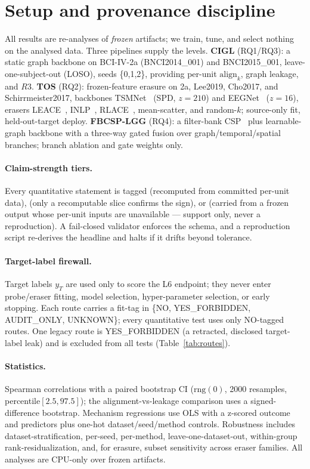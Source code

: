 \section{Setup and provenance discipline}
\label{sec:setup}

All results are re-analyses of \emph{frozen} artifacts; we train, tune, and select nothing on the
analysed data. Three pipelines supply the levels. \textbf{CIGL} (RQ1/RQ3): a static graph backbone on
BCI-IV-2a (BNCI2014\_001) and BNCI2015\_001, leave-one-subject-out (LOSO), seeds \{0,1,2\}, providing
per-unit $\mathrm{align}_k$, graph leakage, and $R3$. \textbf{TOS} (RQ2): frozen-feature erasure on
2a, Lee2019, Cho2017, and Schirrmeister2017, backbones TSMNet~\citep{kobler2022tsmnet}
(SPD, $z{=}210$) and EEGNet~\citep{lawhern2018eegnet} ($z{=}16$), erasers
LEACE~\citep{belrose2023leace}, INLP~\citep{ravfogel2020inlp}, RLACE~\citep{ravfogel2022rlace},
mean-scatter, and random-$k$; source-only fit, held-out-target deploy. \textbf{FBCSP-LGG} (RQ4): a
filter-bank CSP~\citep{ang2012fbcsp} plus learnable-graph backbone with a three-way gated fusion over
graph/temporal/spatial branches; branch ablation and gate weights only.

\paragraph{Claim-strength tiers.} Every quantitative statement is tagged  (recomputed
from committed per-unit data),  (only a recomputable slice confirms the
sign), or  (carried from a frozen output whose per-unit inputs are
unavailable --- support only, never a reproduction). A fail-closed validator enforces the schema, and a
reproduction script re-derives the headline and halts if it drifts beyond tolerance.

\paragraph{Target-label firewall.} Target labels $y_T$ are used only to score the L6 endpoint; they
never enter probe/eraser fitting, model selection, hyper-parameter selection, or early stopping. Each
route carries a fit-tag in \{NO, YES\_FORBIDDEN, AUDIT\_ONLY, UNKNOWN\}; every quantitative test uses
only NO-tagged routes. One legacy route is YES\_FORBIDDEN (a retracted, disclosed target-label leak)
and is excluded from all tests (Table~\ref{tab:routes}).

\paragraph{Statistics.} Spearman correlations with a paired bootstrap CI ($\mathrm{rng}(0)$, 2000
resamples, percentile$[2.5,97.5]$); the alignment-vs-leakage comparison uses a signed-difference
bootstrap. Mechanism regressions use OLS with a z-scored outcome and predictors plus one-hot
dataset/seed/method controls. Robustness includes dataset-stratification, per-seed, per-method,
leave-one-dataset-out, within-group rank-residualization, and, for erasure, subset sensitivity across
eraser families. All analyses are CPU-only over frozen artifacts.
